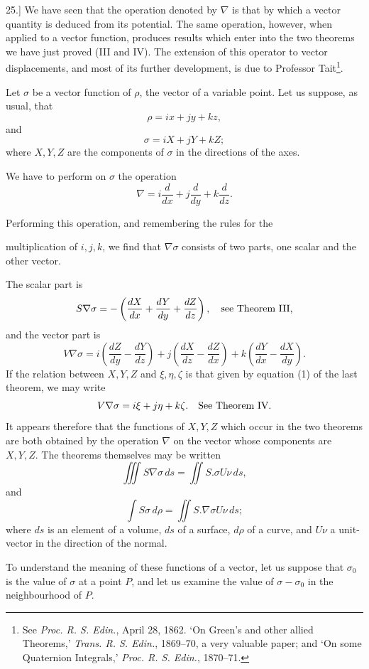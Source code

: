 \documentclass[11pt,a4paper]{article}
\begin{document}
25.] We have seen that the operation denoted by \(\nabla\) is that by
which a vector quantity is deduced from its potential. The same
operation, however, when applied to a vector function, produces results
which enter into the two theorems we have just proved (III and IV). The
extension of this operator to vector displacements, and most of its
further development, is due to Professor Tait\footnote{See
\textit{Proc. R. S. Edin.}, April 28, 1862. `On Green's and other
allied Theorems,' \textit{Trans. R. S. Edin.}, 1869--70, a very
valuable paper; and `On some Quaternion Integrals,'
\textit{Proc. R. S. Edin.}, 1870--71.}.

Let \(\sigma\) be a vector function of \(\rho\), the vector of a
variable point. Let us suppose, as usual, that
\[
\rho=i x+j y+k z,
\]
and
\[
\sigma=iX+jY+kZ;
\]
where \(X,Y,Z\) are the components of \(\sigma\) in the directions of
the axes.

We have to perform on \(\sigma\) the operation
\[
\nabla=i\frac{d}{dx}+j\frac{d}{dy}+k\frac{d}{dz}.
\]

Performing this operation, and remembering the rules for the

\clearpage
\setcounter{footnote}{0}

multiplication of \(i,j,k\), we find that \(\nabla\sigma\) consists of
two parts, one scalar and the other vector.

The scalar part is
\[
S\nabla\sigma=-\left(\frac{dX}{dx}+\frac{dY}{dy}+\frac{dZ}{dz}\right),
\quad\hbox{see Theorem III,}
\]
and the vector part is
\[
V\nabla\sigma=i\left(\frac{dZ}{dy}-\frac{dY}{dz}\right)
+j\left(\frac{dX}{dz}-\frac{dZ}{dx}\right)
+k\left(\frac{dY}{dx}-\frac{dX}{dy}\right).
\]
If the relation between \(X,Y,Z\) and \(\xi,\eta,\zeta\) is that given
by equation (1) of the last theorem, we may write
\[
V\nabla\sigma=i\xi+j\eta+k\zeta.\quad \hbox{See Theorem IV.}
\]
It appears therefore that the functions of \(X,Y,Z\) which occur in the
two theorems are both obtained by the operation \(\nabla\) on the vector
whose components are \(X,Y,Z\). The theorems themselves may be written
\[
\iiint S\nabla\sigma\,ds=\iint S.\sigma U\nu\,ds,\tag{III}
\]
and
\[
\int S\sigma\,d\rho=\iint S.\nabla\sigma U\nu\,ds;\tag{IV}
\]
where \(ds\) is an element of a volume, \(ds\) of a surface, \(d\rho\)
of a curve, and \(U\nu\) a unit-vector in the direction of the normal.

To understand the meaning of these functions of a vector, let us
suppose that \(\sigma_0\) is the value of \(\sigma\) at a point \(P\),
and let us examine the value of \(\sigma-\sigma_0\) in the neighbourhood
of \(P\).
\end{document}

